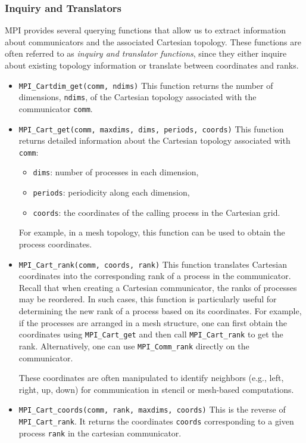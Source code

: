\documentclass[12pt]{book}
\begin{document}
\subsubsection{Inquiry and Translators}
MPI provides several querying functions that allow us to extract information about communicators and the associated Cartesian topology. These functions are often referred to as \emph{inquiry and translator functions}, since they either inquire about existing topology information or translate between coordinates and ranks.

\begin{itemize}
    \item \texttt{MPI\_Cartdim\_get(comm, ndims)}  
    This function returns the number of dimensions, \texttt{ndims}, of the Cartesian topology associated with the communicator \texttt{comm}.

    \item \texttt{MPI\_Cart\_get(comm, maxdims, dims, periods, coords)}  
    This function returns detailed information about the Cartesian topology associated with \texttt{comm}:  
    \begin{itemize}
        \item \texttt{dims}: number of processes in each dimension,  
        \item \texttt{periods}: periodicity along each dimension,  
        \item \texttt{coords}: the coordinates of the calling process in the Cartesian grid.  
    \end{itemize}
    For example, in a mesh topology, this function can be used to obtain the process coordinates.

    \item \texttt{MPI\_Cart\_rank(comm, coords, rank)}  
    This function translates Cartesian coordinates into the corresponding rank of a process in the communicator.  
    Recall that when creating a Cartesian communicator, the ranks of processes may be reordered. In such cases, this function is particularly useful for determining the new rank of a process based on its coordinates. For example, if the processes are arranged in a mesh structure, one can first obtain the coordinates using \texttt{MPI\_Cart\_get} and then call \texttt{MPI\_Cart\_rank} to get the rank. Alternatively, one can use \texttt{MPI\_Comm\_rank} directly on the communicator.  

    These coordinates are often manipulated to identify neighbors (e.g., left, right, up, down) for communication in stencil or mesh-based computations.

    \item \texttt{MPI\_Cart\_coords(comm, rank, maxdims, coords)}  
    This is the reverse of \texttt{MPI\_Cart\_rank}. It returns the coordinates \texttt{coords} corresponding to a given process \texttt{rank} in the cartesian communicator.
\end{itemize}
\end{document}
